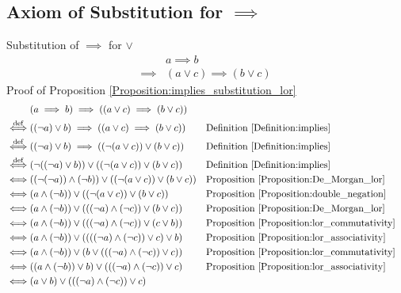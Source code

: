 \subsection{Axiom of Substitution for $\implies$}
\begin{prop}
\label{Proposition:implies_substitution_lor}
Substitution of $\implies$ for $\lor$
\begin{align*}
& a \implies b \\
\implies & (a \lor c) \implies (b \lor c)
\end{align*}
Proof of Proposition \ref{Proposition:implies_substitution_lor}
\begin{align*}
& (a \implies b) \implies ((a \lor c) \implies (b \lor c)) \\
\overset{\operatorname{def}}{\iff} & ((\lnot a) \lor b) \implies ((a \lor c) \implies (b \lor c))
& & \text{Definition \ref{Definition:implies}} \\
\overset{\operatorname{def}}{\iff} & ((\lnot a) \lor b) \implies ((\lnot (a \lor c)) \lor (b \lor c))
& & \text{Definition \ref{Definition:implies}} \\
\overset{\operatorname{def}}{\iff} & (\lnot ((\lnot a) \lor b)) \lor ((\lnot (a \lor c)) \lor (b \lor c))
& & \text{Definition \ref{Definition:implies}} \\
\iff & ((\lnot (\lnot a)) \land (\lnot b)) \lor ((\lnot (a \lor c)) \lor (b \lor c))
& & \text{Proposition \ref{Proposition:De_Morgan_lor}} \\
\iff & (a \land (\lnot b)) \lor ((\lnot (a \lor c)) \lor (b \lor c))
& & \text{Proposition \ref{Proposition:double_negation}} \\
\iff & (a \land (\lnot b)) \lor (((\lnot a) \land (\lnot c)) \lor (b \lor c))
& & \text{Proposition \ref{Proposition:De_Morgan_lor}} \\
\iff & (a \land (\lnot b)) \lor (((\lnot a) \land (\lnot c)) \lor (c \lor b))
& & \text{Proposition \ref{Proposition:lor_commutativity}} \\
\iff & (a \land (\lnot b)) \lor ((((\lnot a) \land (\lnot c)) \lor c) \lor b)
& & \text{Proposition \ref{Proposition:lor_associativity}} \\
\iff & (a \land (\lnot b)) \lor (b \lor (((\lnot a) \land (\lnot c)) \lor c))
& & \text{Proposition \ref{Proposition:lor_commutativity}} \\
\iff & ((a \land (\lnot b)) \lor b) \lor (((\lnot a) \land (\lnot c)) \lor c)
& & \text{Proposition \ref{Proposition:lor_associativity}} \\
\iff & (a \lor b) \lor (((\lnot a) \land (\lnot c)) \lor c)

\end{align*}
\end{prop}
